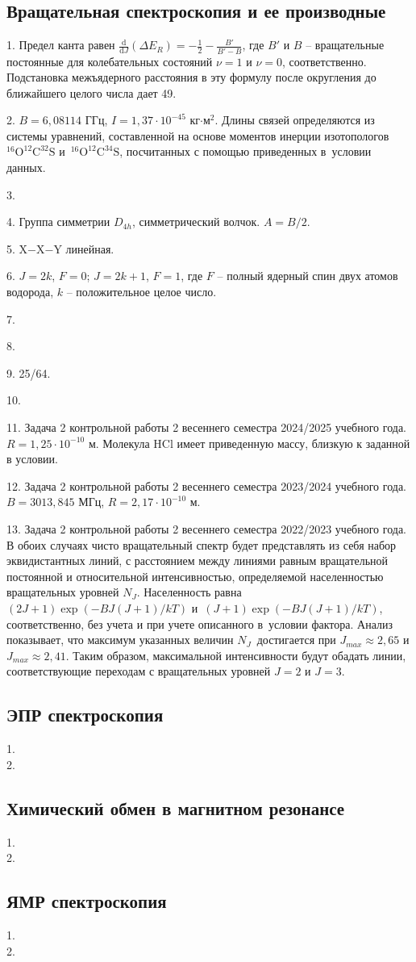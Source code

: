 \subsection{Вращательная спектроскопия и ее производные}
1. Предел канта равен $\frac{\text{d}}{\text{d}J}( \Delta E_R) = -\frac{1}{2}-\frac{B'}{B'-B}$, где $B'$ и $B$ – вращательные постоянные для колебательных состояний $\nu=1$ и $\nu=0$, соответственно. Подстановка межъядерного расстояния в эту формулу после округления до ближайшего целого числа дает 49.\par
2. $B=6,08114$ ГГц, $I=1,37\cdot10^{-45}$ кг$\cdot$м$^2$. Длины связей определяются из системы уравнений, составленной на основе моментов инерции изотопологов $^{16}\text{O}^{12}\text{C}^{32}\text{S}$ и~$^{16}\text{O}^{12}\text{C}^{34}\text{S}$, посчитанных с помощью приведенных в~условии данных.\par
3. \par
4. Группа симметрии $D_{4h}$, симметрический волчок. $A=B/2$.\par
5. X$-$X$-$Y линейная.\par
6. $J=2k$, $F=0$; $J=2k+1$, $F=1$, где $F$ – полный ядерный спин двух атомов водорода, $k$ – положительное целое число.\par
7. \par
8. \par
9. 25/64.\par
10. \par
11. Задача 2 контрольной работы 2 весеннего семестра 2024/2025 учебного года. $R=1,25\cdot10^{-10}$ м. Молекула HCl имеет приведенную массу, близкую к заданной в условии. \par
12. Задача 2 контрольной работы 2 весеннего семестра 2023/2024 учебного года. $B=3013,845$ МГц, $R=2,17\cdot10^{-10}$ м.\par
13. Задача 2 контрольной работы 2 весеннего семестра 2022/2023 учебного года. В обоих случаях чисто вращательный спектр будет представлять из себя набор эквидистантных линий, с расстоянием между линиями равным вращательной постоянной и относительной интенсивностью, определяемой населенностью вращательных уровней $N_J$. Населенность равна $(2J+1)\exp(-BJ(J+1)/kT)$ и~$(J+1)\exp(-BJ(J+1)/kT)$, соответственно, без учета и при учете описанного в~условии фактора. Анализ показывает, что максимум указанных величин $N_J$~достигается при $J_{max}\approx 2,65$ и $J_{max}\approx 2,41$. Таким образом, максимальной интенсивности будут обадать линии, соответствующие переходам с вращательных уровней $J=2$ и $J=3$.\par
\newpage

\subsection{ЭПР спектроскопия}
1. \\
2. 
\newpage

\subsection{Химический обмен в магнитном резонансе}
1. \\
2. 
\newpage

\subsection{ЯМР спектроскопия}
1. \\
2. 
\newpage
